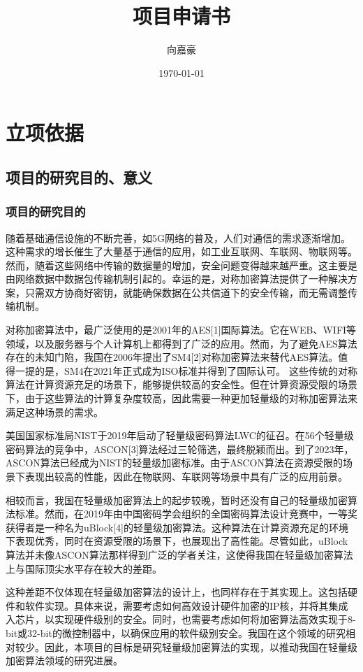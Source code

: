 \documentclass{ctexart}
\begin{document}
\title{项目申请书}
\author{向嘉豪}
\date{\today}

\maketitle


\section{立项依据}
\subsection{项目的研究目的、意义}

\subsubsection{项目的研究目的}
随着基础通信设施的不断完善，如5G网络的普及，人们对通信的需求逐渐增加。这种需求的增长催生了大量基于通信的应用，如工业互联网、车联网、物联网等。
然而，随着这些网络中传输的数据量的增加，安全问题变得越来越严重。这主要是由网络数据中数据包传输机制引起的。幸运的是，对称加密算法提供了一种解决方案，只需双方协商好密钥，就能确保数据在公共信道下的安全传输，而无需调整传输机制。 

对称加密算法中，最广泛使用的是2001年的AES[1]国际算法。它在WEB、WIFI等领域，以及服务器与个人计算机上都得到了广泛的应用。然而，为了避免AES算法存在的未知门陷，我国在2006年提出了SM4[2]对称加密算法来替代AES算法。值得一提的是，SM4在2021年正式成为ISO标准并得到了国际认可。
这些传统的对称算法在计算资源充足的场景下，能够提供较高的安全性。但在计算资源受限的场景下，由于这些算法的计算复杂度较高，因此需要一种更加轻量级的对称加密算法来满足这种场景的需求。

美国国家标准局NIST于2019年启动了轻量级密码算法LWC的征召。在56个轻量级密码算法的竞争中，ASCON[3]算法经过三轮筛选，最终脱颖而出。到了2023年，ASCON算法已经成为NIST的轻量级加密标准。由于ASCON算法在资源受限的场景下表现出较高的性能，因此在物联网、车联网等场景中具有广泛的应用前景。

相较而言，我国在轻量级加密算法上的起步较晚，暂时还没有自己的轻量级加密算法标准。然而，在2019年由中国密码学会组织的全国密码算法设计竞赛中，一等奖获得者是一种名为uBlock[4]的轻量级加密算法。这种算法在计算资源充足的环境下表现优秀，同时在资源受限的场景下，也展现出了高性能。尽管如此，uBlock算法并未像ASCON算法那样得到广泛的学者关注，这使得我国在轻量级加密算法上与国际顶尖水平存在较大的差距。

这种差距不仅体现在轻量级加密算法的设计上，也同样存在于其实现上。这包括硬件和软件实现。具体来说，需要考虑如何高效设计硬件加密的IP核，并将其集成入芯片，以实现硬件级别的安全。同时，也需要考虑如何将加密算法高效实现于8-bit或32-bit的微控制器中，以确保应用的软件级别安全。我国在这个领域的研究相对较少。因此，本项目的目标是研究轻量级加密算法的实现，以推动我国在轻量级加密算法领域的研究进展。
\end{document}

